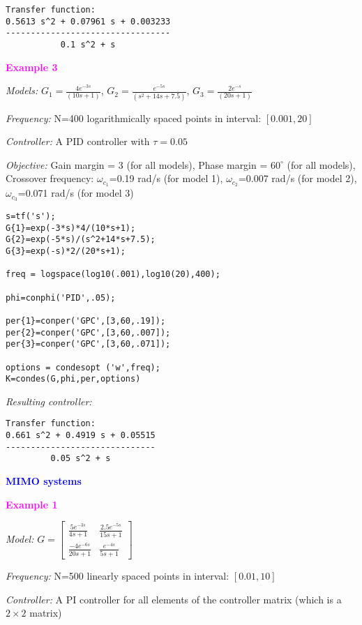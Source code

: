 \documentclass [12pt , a4paper] {article}
\begin{document}
\begin{lstlisting}
Transfer function:
0.5613 s^2 + 0.07961 s + 0.003233
---------------------------------
           0.1 s^2 + s
\end{lstlisting}

\textcolor{magenta}{\textbf{Example 3}}

\emph{Models:} $G_1=\frac{4e^{-3s}}{(10s+1)}$, $G_2=\frac{e^{-5s}}{(s^2+14s+7.5)}$, $G_3=\frac{2e^{-s}}{(20s+1)}$

\emph{Frequency:} N=400 logarithmically spaced points in interval: $[0.001,20]$

\emph{Controller:} A PID controller with $\tau=0.05$

\emph{Objective:} Gain margin = 3 (for all models), Phase margin = $60^{\circ}$ (for all models), 
Crossover frequency: $\omega_{c_1}$=0.19 rad/s (for model 1), $\omega_{c_2}$=0.007 rad/s (for model 2), $\omega_{c_3}$=0.071 rad/s (for model 3) 

\begin{lstlisting}
s=tf('s');
G{1}=exp(-3*s)*4/(10*s+1);
G{2}=exp(-5*s)/(s^2+14*s+7.5);
G{3}=exp(-s)*2/(20*s+1);

freq = logspace(log10(.001),log10(20),400);

phi=conphi('PID',.05);

per{1}=conper('GPC',[3,60,.19]);
per{2}=conper('GPC',[3,60,.007]);
per{3}=conper('GPC',[3,60,.071]);

options = condesopt ('w',freq);
K=condes(G,phi,per,options)
\end{lstlisting}

\emph{Resulting controller:}

\begin{lstlisting}
Transfer function:
0.661 s^2 + 0.4919 s + 0.05515
------------------------------
         0.05 s^2 + s
\end{lstlisting}

\textcolor{blue}{\textbf{MIMO systems}}

\textcolor{magenta}{\textbf{Example 1}}

\emph{Model:} $ G=\left[ \begin{array}{cc}
\frac{5e^{-3s}}{4s+1}  &  \frac{2.5e^{-5s}}{15s+1} \\[.25 cm]
\frac{-4e^{-6s}}{20s+1}  &  \frac{e^{-4s}}{5s+1} 
\end{array} \right] $

\emph{Frequency:} N=500 linearly spaced points in interval: $[0.01,10]$

\emph{Controller:} A PI controller for all elements of the controller matrix (which is a $2\times2$ matrix)
\end{document}
